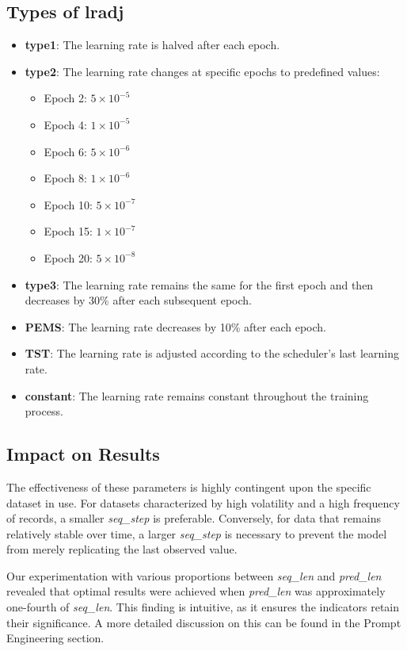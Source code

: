 \subsection{Types of \textbf{lradj}}
\begin{itemize}
	\item \textbf{type1}: The learning rate is halved after each epoch.
	\item \textbf{type2}: The learning rate changes at specific epochs to predefined values:
	      \begin{itemize}
		      \item Epoch 2: $5 \times 10^{-5}$
		      \item Epoch 4: $1 \times 10^{-5}$
		      \item Epoch 6: $5 \times 10^{-6}$
		      \item Epoch 8: $1 \times 10^{-6}$
		      \item Epoch 10: $5 \times 10^{-7}$
		      \item Epoch 15: $1 \times 10^{-7}$
		      \item Epoch 20: $5 \times 10^{-8}$
	      \end{itemize}
	\item \textbf{type3}: The learning rate remains the same for the first epoch and then decreases by 30\% after each subsequent epoch.
	\item \textbf{PEMS}: The learning rate decreases by 10\% after each epoch.
	\item \textbf{TST}: The learning rate is adjusted according to the scheduler’s last learning rate.
	\item \textbf{constant}: The learning rate remains constant throughout the training process.
\end{itemize}

\subsection{Impact on Results}
The effectiveness of these parameters is highly contingent upon the specific dataset in use. For datasets characterized by high volatility and a high frequency of records, a smaller \textit{seq\_step} is preferable. Conversely, for data that remains relatively stable over time, a larger \textit{seq\_step} is necessary to prevent the model from merely replicating the last observed value.

Our experimentation with various proportions between \textit{seq\_len} and \textit{pred\_len} revealed that optimal results were achieved when \textit{pred\_len} was approximately one-fourth of \textit{seq\_len}. This finding is intuitive, as it ensures the indicators retain their significance. A more detailed discussion on this can be found in the Prompt Engineering section.

